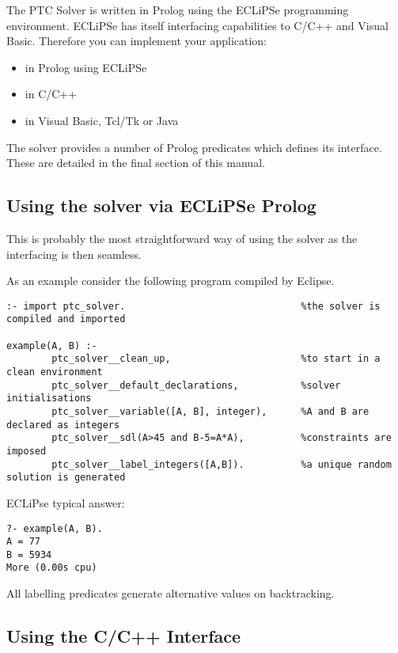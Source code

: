 \documentclass{article}
\begin{document}
The PTC Solver is written in Prolog using the ECLiPSe programming environment.
ECLiPSe has itself interfacing capabilities to C/C++ and Visual Basic.
Therefore you can implement your application:

\begin{itemize}
\item in Prolog using ECLiPSe
\item in C/C++
\item in Visual Basic, Tcl/Tk or Java
\end{itemize}

The solver provides a number of Prolog predicates which
defines its interface. These are detailed in the final
section of this manual.

\subsection{Using the solver via ECLiPSe Prolog}

This is probably the most straightforward way of using the solver as the
interfacing is
then seamless.

As an example consider the following program compiled by Eclipse.

\begin{verbatim}
:- import ptc_solver.                               %the solver is compiled and imported

example(A, B) :-
        ptc_solver__clean_up,                       %to start in a clean environment
        ptc_solver__default_declarations,           %solver initialisations
        ptc_solver__variable([A, B], integer),      %A and B are declared as integers
        ptc_solver__sdl(A>45 and B-5=A*A),          %constraints are imposed
        ptc_solver__label_integers([A,B]).          %a unique random solution is generated
\end{verbatim}

ECLiPse typical answer:

\begin{verbatim}
?- example(A, B).
A = 77
B = 5934
More (0.00s cpu)
\end{verbatim}

All labelling predicates generate alternative values on backtracking.

\subsection{Using the C/C++ Interface}
\end{document}
